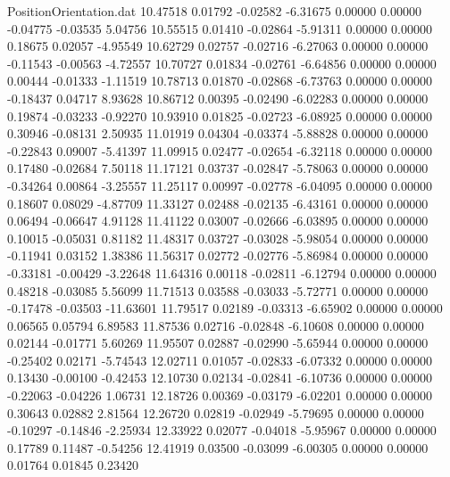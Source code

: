 \begin{filecontents}{PositionOrientation.dat}
  10.47518    0.01792   -0.02582    -6.31675    0.00000    0.00000   -0.04775   -0.03535    5.04756
  10.55515    0.01410   -0.02864    -5.91311    0.00000    0.00000    0.18675    0.02057   -4.95549
  10.62729    0.02757   -0.02716    -6.27063    0.00000    0.00000   -0.11543   -0.00563   -4.72557
  10.70727    0.01834   -0.02761    -6.64856    0.00000    0.00000    0.00444   -0.01333   -1.11519
  10.78713    0.01870   -0.02868    -6.73763    0.00000    0.00000   -0.18437    0.04717    8.93628
  10.86712    0.00395   -0.02490    -6.02283    0.00000    0.00000    0.19874   -0.03233   -0.92270
  10.93910    0.01825   -0.02723    -6.08925    0.00000    0.00000    0.30946   -0.08131    2.50935
  11.01919    0.04304   -0.03374    -5.88828    0.00000    0.00000   -0.22843    0.09007   -5.41397
  11.09915    0.02477   -0.02654    -6.32118    0.00000    0.00000    0.17480   -0.02684    7.50118
  11.17121    0.03737   -0.02847    -5.78063    0.00000    0.00000   -0.34264    0.00864   -3.25557
  11.25117    0.00997   -0.02778    -6.04095    0.00000    0.00000    0.18607    0.08029   -4.87709
  11.33127    0.02488   -0.02135    -6.43161    0.00000    0.00000    0.06494   -0.06647    4.91128
  11.41122    0.03007   -0.02666    -6.03895    0.00000    0.00000    0.10015   -0.05031    0.81182
  11.48317    0.03727   -0.03028    -5.98054    0.00000    0.00000   -0.11941    0.03152    1.38386
  11.56317    0.02772   -0.02776    -5.86984    0.00000    0.00000   -0.33181   -0.00429   -3.22648
  11.64316    0.00118   -0.02811    -6.12794    0.00000    0.00000    0.48218   -0.03085    5.56099
  11.71513    0.03588   -0.03033    -5.72771    0.00000    0.00000   -0.17478   -0.03503  -11.63601
  11.79517    0.02189   -0.03313    -6.65902    0.00000    0.00000    0.06565    0.05794    6.89583
  11.87536    0.02716   -0.02848    -6.10608    0.00000    0.00000    0.02144   -0.01771    5.60269
  11.95507    0.02887   -0.02990    -5.65944    0.00000    0.00000   -0.25402    0.02171   -5.74543
  12.02711    0.01057   -0.02833    -6.07332    0.00000    0.00000    0.13430   -0.00100   -0.42453
  12.10730    0.02134   -0.02841    -6.10736    0.00000    0.00000   -0.22063   -0.04226    1.06731
  12.18726    0.00369   -0.03179    -6.02201    0.00000    0.00000    0.30643    0.02882    2.81564
  12.26720    0.02819   -0.02949    -5.79695    0.00000    0.00000   -0.10297   -0.14846   -2.25934
  12.33922    0.02077   -0.04018    -5.95967    0.00000    0.00000    0.17789    0.11487   -0.54256
  12.41919    0.03500   -0.03099    -6.00305    0.00000    0.00000    0.01764    0.01845    0.23420

\end{filecontents}
